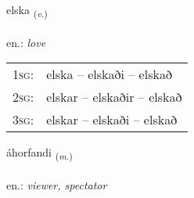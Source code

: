 \documentclass[frontgrid, backgrid]{flacards}\usepackage[]{graphicx}\usepackage[]{xcolor}
\begin{document}
{elska \small{\textsubscript{(\textit{v.})}} \\[1ex] %
\textphonetic{[ɛlska]} \\
en.: \emph{love} \\  [2ex]
\renewcommand*{\arraystretch}{0.8}
\begin{tabular}{p{1cm}l}
\textsc{1sg}: & elska -- elskaði -- elskað \\ 
\textsc{2sg}: & elskar -- elskaðir -- elskað \\ 
\textsc{3sg}: & elskar -- elskaði -- elskað \\ 
\end{tabular}
}

\renewcommand{\flhead}{\vskip5pt \fboxsep=0pt {\small\bfseries\footnotesize Nafnorð | Noun}}
\renewcommand{\fcfoot}{\vskip5pt \fboxsep=0pt \hspace{2pt}{\small\bfseries\footnotesize 2K}}

\renewcommand{\blhead}{\vskip5pt {\small\bfseries\footnotesize Nafnorð | Noun }}
\renewcommand{\bcfoot}{\vskip5pt \hspace{2pt}{\small\bfseries\footnotesize 2K}}


{áhorfandi \small{\textsubscript{(\textit{m.})}} \\[1ex] %
\textphonetic{[auːhɔrvantɪ]} \\
en.: \emph{viewer, spectator} \\  [2ex]
\renewcommand*{\arraystretch}{0.8}
}

\renewcommand{\flhead}{\vskip5pt \fboxsep=0pt {\small\bfseries\footnotesize Nafnorð | Noun}}
\renewcommand{\fcfoot}{\vskip5pt \fboxsep=0pt \hspace{2pt}{\small\bfseries\footnotesize 2K}}
\end{document}
